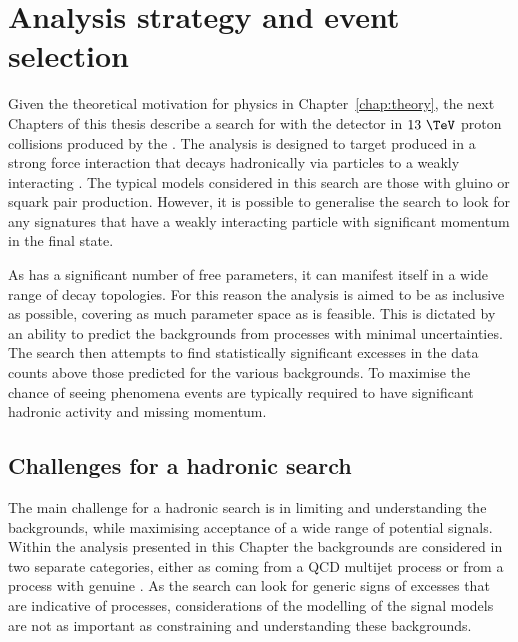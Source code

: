 \chapter{Analysis strategy and event selection} %
\label{chap:selection}

Given the theoretical motivation for \BSM physics in
Chapter~\ref{chap:theory}, the next Chapters of this thesis describe a
search for \SUSY with the \CMS detector in $13~\tev$ proton collisions
produced by the \LHC. The analysis is designed to target \SUSY
produced in a strong force interaction that decays hadronically via
\SM particles to a weakly interacting \LSP. The typical \SUSY models
considered in this search are those with gluino or squark pair
production. However, it is possible to generalise the search to look
for any \BSM signatures that have a weakly interacting particle with
significant momentum in the final state.

As \SUSY has a significant number of free parameters, it can manifest
itself in a wide range of decay topologies. For this reason the
analysis is aimed to be as inclusive as possible, covering as much
parameter space as is feasible.  This is dictated by an ability to
predict the backgrounds from \SM processes with minimal uncertainties.
The search then attempts to find statistically significant excesses in
the data counts above those predicted for the various backgrounds. To
maximise the chance of seeing \BSM phenomena events are typically
required to have significant hadronic activity and missing momentum.  


\section{Challenges for a hadronic \BSM search}
\label{sec:challenge}

The main challenge for a hadronic \BSM search is in limiting and
understanding the backgrounds, while maximising acceptance of a wide
range of potential \BSM signals. Within the analysis presented in this
Chapter the backgrounds are considered in two separate categories,
either as coming from a QCD multijet process or from a \SM process
with genuine \MET. As the search can look for generic signs of
excesses that are indicative of \BSM processes, considerations of the
modelling of the signal models are not as important as constraining
and understanding these backgrounds.

